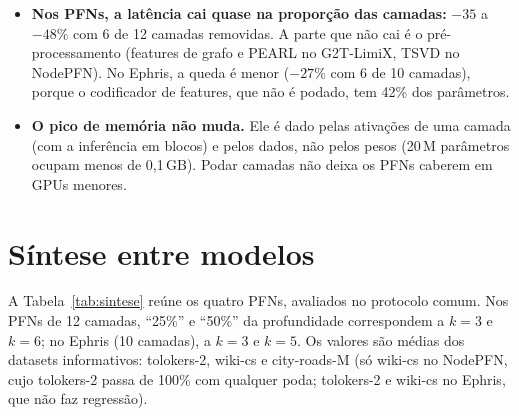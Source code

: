 \documentclass[12pt,a4paper]{article}
\begin{document}
\begin{itemize}
  \item \textbf{Nos PFNs, a latência cai quase na proporção das camadas:} $-35$ a $-48\%$ com 6 de 12 camadas removidas. A parte que não cai é o pré-processamento (features de grafo e PEARL no G2T-LimiX, TSVD no NodePFN). No Ephris, a queda é menor ($-27\%$ com 6 de 10 camadas), porque o codificador de features, que não é podado, tem 42\% dos parâmetros.
  \item \textbf{O pico de memória não muda.} Ele é dado pelas ativações de uma camada (com a inferência em blocos) e pelos dados, não pelos pesos (20\,M parâmetros ocupam menos de 0,1\,GB). Podar camadas não deixa os PFNs caberem em GPUs menores.
\end{itemize}


\section{Síntese entre modelos}
\label{sec:sintese}

A Tabela~\ref{tab:sintese} reúne os quatro PFNs, avaliados no protocolo comum. Nos PFNs de 12 camadas, ``25\%'' e ``50\%'' da profundidade correspondem a $k=3$ e $k=6$; no Ephris (10 camadas), a $k=3$ e $k=5$. Os valores são médias dos datasets informativos: tolokers-2, wiki-cs e city-roads-M (só wiki-cs no NodePFN, cujo tolokers-2 passa de 100\% com qualquer poda; tolokers-2 e wiki-cs no Ephris, que não faz regressão).

\begin{table}[H]
\centering
\caption{Síntese: retido (\%) pela melhor ordem de BI (token-alvo nos PFNs) e pela ordem aleatória (mediana), correlação BI $\times$ importância, KD com $\approx$50\% dos parâmetros e redução de latência com 50\% das camadas.}
\label{tab:sintese}
\end{table}
\end{document}
